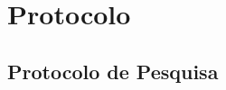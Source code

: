 \documentclass{beamer}
\begin{document}


\section{Protocolo}

\subsection{Protocolo de Pesquisa}
\end{document}
